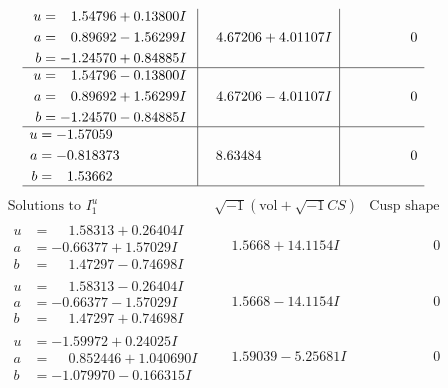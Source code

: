 \documentclass[1p]{elsarticle_modified}
\theoremstyle{definition}
\newcommand{\I}{\sqrt{-1}}
\begin{document}
$$\begin{array}{c|c|c}
\begin{aligned}
u &= \phantom{-}1.54796 + 0.13800 I \\
a &= \phantom{-}0.89692 - 1.56299 I \\
b &= -1.24570 + 0.84885 I\end{aligned}
 & \phantom{-}4.67206 + 4.01107 I & \phantom{-0.000000 } 0 \\ \hline\begin{aligned}
u &= \phantom{-}1.54796 - 0.13800 I \\
a &= \phantom{-}0.89692 + 1.56299 I \\
b &= -1.24570 - 0.84885 I\end{aligned}
 & \phantom{-}4.67206 - 4.01107 I & \phantom{-0.000000 } 0 \\ \hline\begin{aligned}
u &= -1.57059\phantom{ +0.000000I} \\
a &= -0.818373\phantom{ +0.000000I} \\
b &= \phantom{-}1.53662\phantom{ +0.000000I}\end{aligned}
 & \phantom{-}8.63484\phantom{ +0.000000I} & \phantom{-0.000000 } 0\\
 \hline 
 \end{array}$$\newpage$$\begin{array}{c|c|c}  
\text{Solutions to }I^u_{1}& \I (\text{vol} + \sqrt{-1}CS) & \text{Cusp shape}\\
 \hline 
\begin{aligned}
u &= \phantom{-}1.58313 + 0.26404 I \\
a &= -0.66377 + 1.57029 I \\
b &= \phantom{-}1.47297 - 0.74698 I\end{aligned}
 & \phantom{-}1.5668 + 14.1154 I & \phantom{-0.000000 } 0 \\ \hline\begin{aligned}
u &= \phantom{-}1.58313 - 0.26404 I \\
a &= -0.66377 - 1.57029 I \\
b &= \phantom{-}1.47297 + 0.74698 I\end{aligned}
 & \phantom{-}1.5668 - 14.1154 I & \phantom{-0.000000 } 0 \\ \hline\begin{aligned}
u &= -1.59972 + 0.24025 I \\
a &= \phantom{-}0.852446 + 1.040690 I \\
b &= -1.079970 - 0.166315 I\end{aligned}
 & \phantom{-}1.59039 - 5.25681 I & \phantom{-0.000000 } 0 \\ \hline\begin{aligned}

\end{aligned}
\end{array}$$
\end{document}
